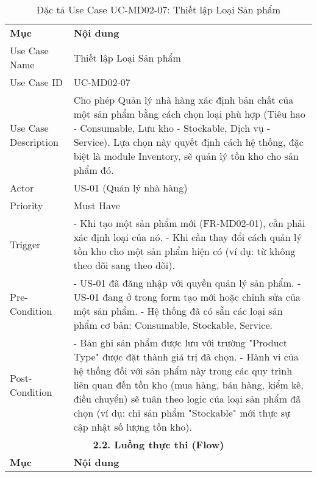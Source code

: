 \begin{longtable}{|m{4cm}|p{11cm}|}
\caption{Đặc tả Use Case UC-MD02-07: Thiết lập Loại Sản phẩm} \label{tab:uc_md02_07} \\
\hline

\endhead %

\hline
\endfoot %

\hline
\endlastfoot %
\multicolumn{2}{|c|}{\textbf{2.1. Tóm tắt (Summary)}} \\
\hline
\textbf{Mục} & \textbf{Nội dung} \\
\hline
Use Case Name & Thiết lập Loại Sản phẩm \\
\hline
Use Case ID & UC-MD02-07 \\
\hline
Use Case Description & Cho phép Quản lý nhà hàng xác định bản chất của một sản phẩm bằng cách chọn loại phù hợp (Tiêu hao - Consumable, Lưu kho - Stockable, Dịch vụ - Service). Lựa chọn này quyết định cách hệ thống, đặc biệt là module Inventory, sẽ quản lý tồn kho cho sản phẩm đó. \\
\hline
Actor & US-01 (Quản lý nhà hàng) \\
\hline
Priority & Must Have \\
\hline
Trigger & - Khi tạo một sản phẩm mới (FR-MD02-01), cần phải xác định loại của nó. \newline - Khi cần thay đổi cách quản lý tồn kho cho một sản phẩm hiện có (ví dụ: từ không theo dõi sang theo dõi). \\
\hline
Pre-Condition & - US-01 đã đăng nhập với quyền quản lý sản phẩm. \newline - US-01 đang ở trong form tạo mới hoặc chỉnh sửa của một sản phẩm. \newline - Hệ thống đã có sẵn các loại sản phẩm cơ bản: Consumable, Stockable, Service. \\
\hline
Post-Condition & - Bản ghi sản phẩm được lưu với trường "Product Type" được đặt thành giá trị đã chọn. \newline - Hành vi của hệ thống đối với sản phẩm này trong các quy trình liên quan đến tồn kho (mua hàng, bán hàng, kiểm kê, điều chuyển) sẽ tuân theo logic của loại sản phẩm đã chọn (ví dụ: chỉ sản phẩm "Stockable" mới thực sự cập nhật số lượng tồn kho). \\
\hline
\multicolumn{2}{|c|}{\textbf{2.2. Luồng thực thi (Flow)}} \\
\hline
\textbf{Mục} & \textbf{Nội dung} \\
\hline

\end{longtable}
